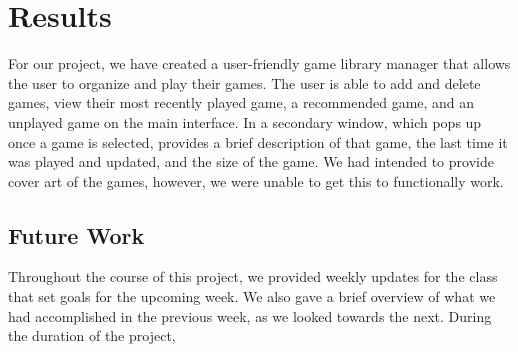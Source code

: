 \documentclass[10pt,conference,onecolumn,compsoc]{IEEEtran}
\begin{document}
\section{Results}
For our project, we have created a user-friendly game library manager that allows the user to organize and play their games. The user is able to add and delete games, view their most recently played game, a recommended game, and an unplayed game on the main interface. In a secondary window, which pops up once a game is selected, provides a brief description of that game, the last time it was played and updated, and the size of the game. We had intended to provide cover art of the games, however, we were unable to get this to functionally work.
%
\subsection{Future Work}
Throughout the course of this project, we provided weekly updates for the class that set goals for the upcoming week. We also gave a brief overview of what we had accomplished in the previous week, as we looked towards the next. During the duration of the project,
%
%
%
%
%
%
%
%



\end{document}
